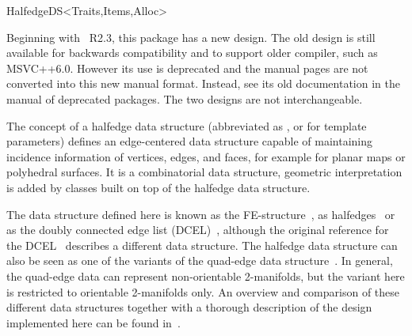 
\ccRefPageBegin



\begin{ccRefConcept}{HalfedgeDS<Traits,Items,Alloc>}

\ccTagFullDeclarations





Beginning with \cgal\ R2.3, this package has a new design.  The old
design is still available for backwards compatibility and to support
older compiler, such as MSVC++6.0. However its use is deprecated and
the manual pages are not converted into this new manual
format. Instead, see its old documentation in the manual of 
deprecated packages.  The two designs are not interchangeable.

\ccDefinition
  
The concept of a halfedge data structure (abbreviated as , or
 for template parameters) defines an edge-centered data structure
capable of maintaining incidence information of vertices, edges, and
faces, for example for planar maps or polyhedral surfaces. It is a
combinatorial data structure, geometric interpretation is added by
classes built on top of the halfedge data structure. 

The data structure defined here is known as the
FE-structure~\cite{w-ebdss-85}, as
halfedges~\cite{m-ism-88,cgal:bfh-mgedm-95} or as the doubly connected edge
list (DCEL)~\cite{bkos-cgaa-97}, although the original reference for
the DCEL~\cite{mp-fitcp-78} describes a different data structure. The
halfedge data structure can also be seen as one of the variants of the
quad-edge data structure~\cite{gs-pmgsc-85}. In general, the quad-edge
data can represent non-orientable 2-manifolds, but the variant here is
restricted to orientable 2-manifolds only. An overview and comparison
of these different data structures together with a thorough
description of the design implemented here can be found
in~\cite{k-ugpdd-99}.


\end{ccRefConcept}
